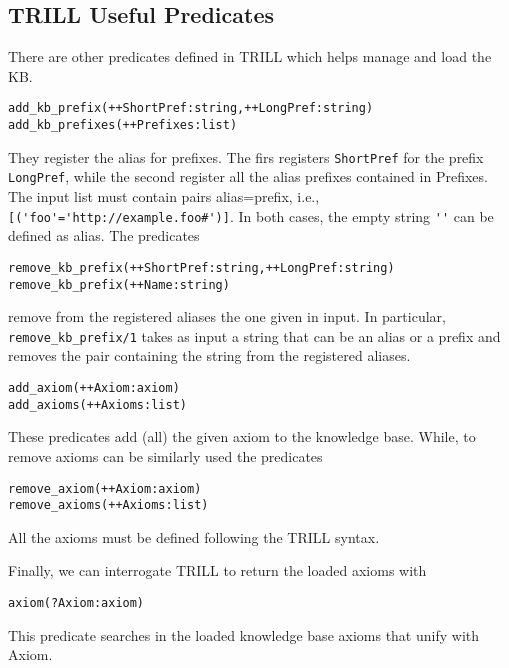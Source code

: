 \subsection{TRILL Useful Predicates}
There are other predicates defined in TRILL which helps manage and load the KB.
\begin{verbatim}
add_kb_prefix(++ShortPref:string,++LongPref:string)
add_kb_prefixes(++Prefixes:list)
\end{verbatim}
They register the alias for prefixes. The firs registers \verb|ShortPref| for the prefix \verb|LongPref|, while the second register all the alias prefixes contained in Prefixes. The input list must contain pairs alias=prefix, i.e., \verb|[('foo'='http://example.foo#')]|. In both cases, the empty string \verb|''| can be defined as alias. The predicates
\begin{verbatim}
remove_kb_prefix(++ShortPref:string,++LongPref:string)
remove_kb_prefix(++Name:string)
\end{verbatim}
remove from the registered aliases the one given in input. In particular, \verb|remove_kb_prefix/1| takes as input a string that can be an alias or a prefix and removes the pair containing the string from the registered aliases.

\begin{verbatim}
add_axiom(++Axiom:axiom)
add_axioms(++Axioms:list)
\end{verbatim}
These predicates add (all) the given axiom to the knowledge base. While, to remove axioms can be similarly used the predicates
\begin{verbatim}
remove_axiom(++Axiom:axiom)
remove_axioms(++Axioms:list)
\end{verbatim}
All the axioms must be defined following the TRILL syntax.

Finally, we can interrogate TRILL to return the loaded axioms with
\begin{verbatim}
axiom(?Axiom:axiom)
\end{verbatim}
This predicate searches in the loaded knowledge base axioms that unify with Axiom.

